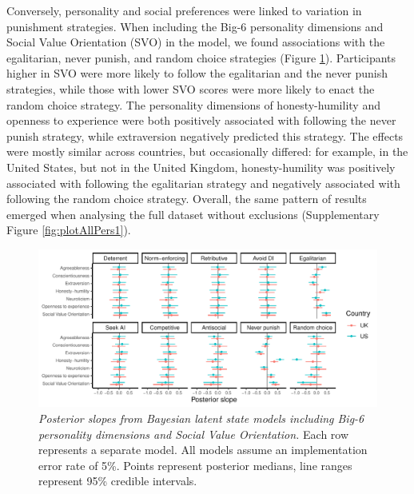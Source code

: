 \documentclass[
  man,floatsintext]{apa6}
\begin{document}
Conversely, personality and social preferences were linked to variation in
punishment strategies. When including the Big-6 personality dimensions and
Social Value Orientation (SVO) in the model, we found associations with the
egalitarian, never punish, and random choice strategies (Figure
\ref{fig:plotAllPers2}). Participants higher in SVO were more likely to follow
the egalitarian and the never punish strategies, while those with lower SVO
scores were more likely to enact the random choice strategy. The personality
dimensions of honesty-humility and openness to experience were both positively
associated with following the never punish strategy, while extraversion
negatively predicted this strategy. The effects were mostly similar across
countries, but occasionally differed: for example, in the United States,
but not in the United Kingdom, honesty-humility was positively associated with
following the egalitarian strategy and negatively associated with following
the random choice strategy. Overall, the same pattern of results emerged when
analysing the full dataset without exclusions (Supplementary Figure
\ref{fig:plotAllPers1}).







\begin{figure}
\centering
\includegraphics{manuscript_files/figure-latex/plotAllPers2-1.pdf}
\caption{\label{fig:plotAllPers2}\emph{Posterior slopes from Bayesian latent state models
including Big-6 personality dimensions and Social Value Orientation.} Each row
represents a separate model. All models assume an implementation error rate of
5\%. Points represent posterior medians, line ranges represent 95\% credible
intervals.}
\end{figure}
\end{document}
